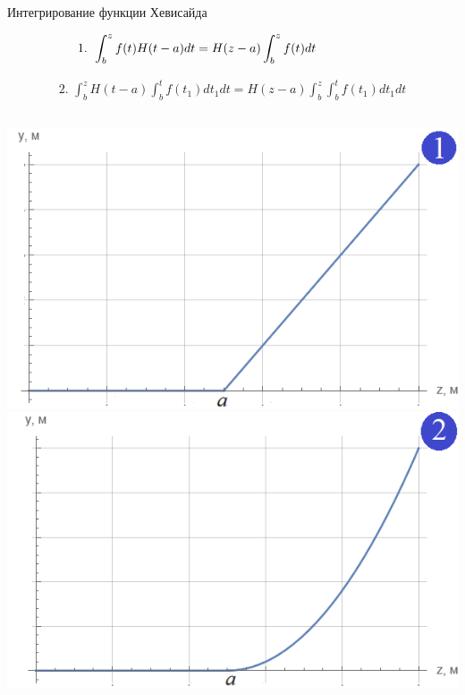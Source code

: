 \documentclass[ignoreonframetext,unicode]{beamer}
\begin{document}
\begin{frame}{Интегрирование функции Хевисайда}
	
	
		\begin{gather*}
			\mbox{1. } \int_b^z f(t) H(t - a) d t = H(z - a)\int_b^z f(t) d t \hspace{20mm}
		\end{gather*}
		
		
		\begin{gather*}
			\mbox{2. } \int_b^z H(t - a) \int_b^{t} f(t_1) d{t_1} dt = H(z - a) \int_b^z \int_b^{t} f(t_1) d{t_1} dt
		\end{gather*}
		
	

	\begin{columns}
	\includegraphics[width=\textwidth]{intHeav}%
	\includegraphics[width=\textwidth]{int2Heav}%
	\end{columns}
	
\end{frame}	
\end{document}
